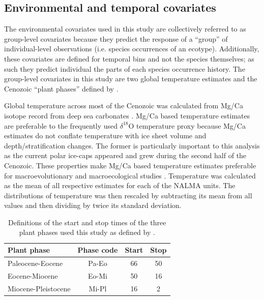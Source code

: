 \documentclass[12pt,letterpaper]{article}
\begin{document}
\subsection*{Environmental and temporal covariates}
The environmental covariates used in this study are collectively referred to as group-level covariates because they predict the response of a ``group'' of individual-level observations (i.e. species occurrences of an ecotype). Additionally, these covariates are defined for temporal bins and not the species themselves; as such they predict individual the parts of each species occurrence history. The group-level covariates in this study are two global temperature estimates and the Cenozoic ``plant phases'' defined by \citet{Graham2011a}. 

Global temperature across most of the Cenozoic was calculated from Mg/Ca isotope record from deep sea carbonates \citep{Cramer2011}. Mg/Ca based temperature estimates are preferable to the frequently used \(\delta^{18}\)O temperature proxy \citep{Zachos2001,Zachos2008,Alroy2000g,Figueirido2012} because Mg/Ca estimates do not conflate temperature with ice sheet volume and depth/stratification changes. The former is particularly important to this analysis as the current polar ice-caps appeared and grew during the second half of the Cenozoic. These properties make Mg/Ca based temperature estimates preferable for macroevolutionary and macroecological studies \citep{Ezard2016a}. Temperature was calculated as the mean of all respective estimates for each of the NALMA units. The distributions of temperature was then rescaled by subtracting its mean from all values and then dividing by twice its standard deviation.

\begin{table}
  \centering
  \caption[Plant phase defintions]{Definitions of the start and stop times of the three plant phases used this study as defined by \citet{Graham2011a}.}
  \label{tab:plant_def}
  \begin{tabular}{l c c c}
    \hline
    Plant phase & Phase code & Start & Stop \\
    \hline
    Paleocene-Eocene & Pa-Eo & 66 & 50 \\
    Eocene-Miocene & Eo-Mi & 50 & 16 \\
    Miocene-Pleistocene & Mi-Pl & 16 & 2 \\
    \hline
  \end{tabular}
\end{table}
\end{document}
